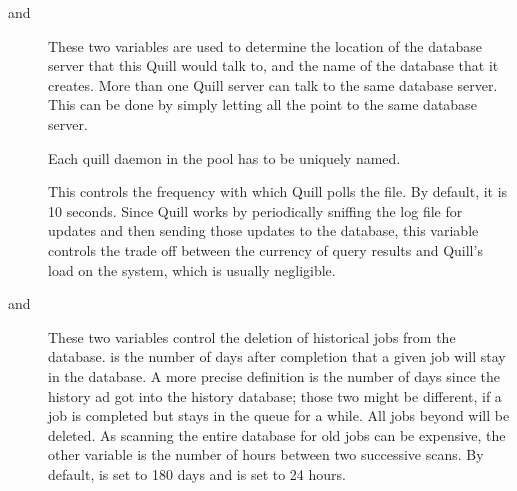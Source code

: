 \begin{description}

\item[ and ]
These two variables are used to determine the location of the database
server that this Quill would talk to, and the name of the database that
it creates.  More than one Quill server can talk to the same database
server.  This can be done by simply letting all the 
 point to the same database server.

\item[]
Each quill daemon in the pool has to be uniquely named.

\item[]
This controls the frequency with which Quill polls the
 file.  By default, it is 10 seconds.  Since Quill
works by periodically sniffing the log file for updates and then sending
those updates to the database, this variable controls the trade off between
the currency of query results and Quill's load on the system, which
is usually negligible.

\item[ and 
		]
These two variables control the deletion of historical jobs from the
database. 
 is the number of days
after completion that a given job will stay in the database.  
A more precise definition is the number of days since the history ad got 
into the history database; those two might be different,
if a job is completed but stays in the queue for a while.
All jobs beyond  will be deleted.
As scanning the entire database for old jobs can be expensive,
the other variable 
is the number of hours between two successive scans.  By default,
 is set to 180 days and
 is set to 24 hours.


\end{description}
